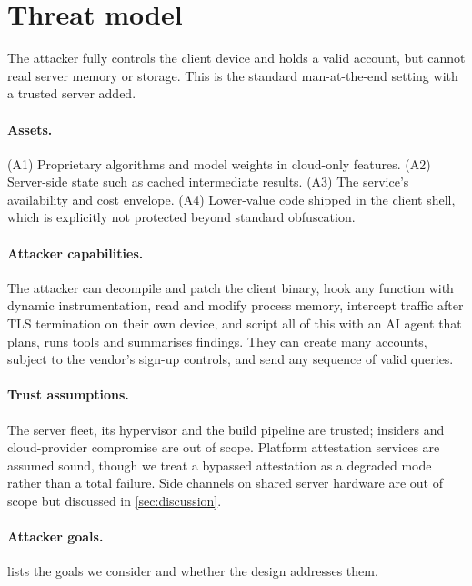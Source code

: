 \section{Threat model}\label{sec:threat}

The attacker fully controls the client device and holds a valid account, but cannot read
server memory or storage. This is the standard man-at-the-end setting
\cite{collberg2009surreptitious} with a trusted server added.

\paragraph{Assets.} (A1) Proprietary algorithms and model weights in cloud-only features.
(A2) Server-side state such as cached intermediate results. (A3) The service's availability
and cost envelope. (A4) Lower-value code shipped in the client shell, which is explicitly
not protected beyond standard obfuscation.

\paragraph{Attacker capabilities.} The attacker can decompile and patch the client binary,
hook any function with dynamic instrumentation, read and modify process memory, intercept
traffic after TLS termination on their own device, and script all of this with an AI agent
that plans, runs tools and summarises findings. They can create many accounts, subject to
the vendor's sign-up controls, and send any sequence of valid queries.

\paragraph{Trust assumptions.} The server fleet, its hypervisor and the build pipeline are
trusted; insiders and cloud-provider compromise are out of scope. Platform attestation
services \cite{google_playintegrity,apple_appattest} are assumed sound, though we treat a
bypassed attestation as a degraded mode rather than a total failure. Side channels on shared
server hardware are out of scope but discussed in \cref{sec:discussion}.

\paragraph{Attacker goals.}  lists the goals we consider and whether the
design addresses them.

